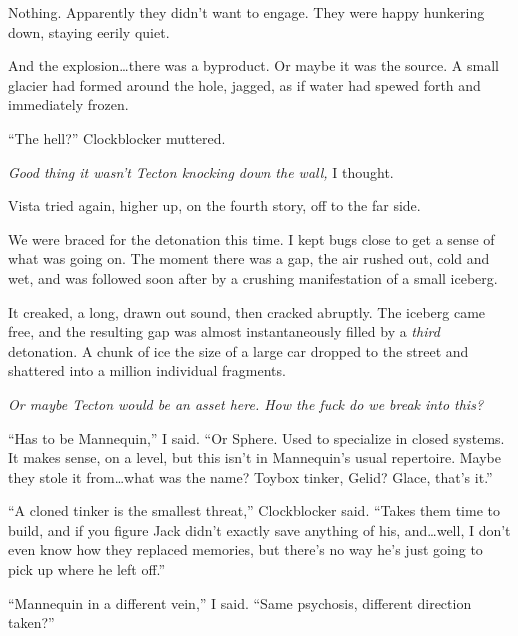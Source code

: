 Nothing.  Apparently they didn't want to engage.  They were happy hunkering down, staying eerily quiet.



And the explosion\ldots there was a byproduct.  Or maybe it was the source.  A small glacier had formed around the hole, jagged, as if water had spewed forth and immediately frozen.



``The hell?''  Clockblocker muttered.



\emph{Good thing it wasn't Tecton knocking down the wall,} I thought.



Vista tried again, higher up, on the fourth story, off to the far side.



We were braced for the detonation this time.  I kept bugs close to get a sense of what was going on.  The moment there was a gap, the air rushed out, cold and wet, and was followed soon after by a crushing manifestation of a small iceberg.



It creaked, a long, drawn out sound, then cracked abruptly.  The iceberg came free, and the resulting gap was almost instantaneously filled by a \emph{third} detonation.  A chunk of ice the size of a large car dropped to the street and shattered into a million individual fragments.



\emph{Or maybe Tecton would be an asset here.  How the fuck do we break into this?}



``Has to be Mannequin,'' I said.  ``Or Sphere.  Used to specialize in closed systems.  It makes sense, on a level, but this isn't in Mannequin's usual repertoire.  Maybe they stole it from\ldots what was the name?  Toybox tinker, Gelid?  Glace, that's it.''



``A cloned tinker is the smallest threat,'' Clockblocker said.  ``Takes them time to build, and if you figure Jack didn't exactly save anything of his, and\ldots well, I don't even know how they replaced memories, but there's no way he's just going to pick up where he left off.''



``Mannequin in a different vein,'' I said.  ``Same psychosis, different direction taken?''



